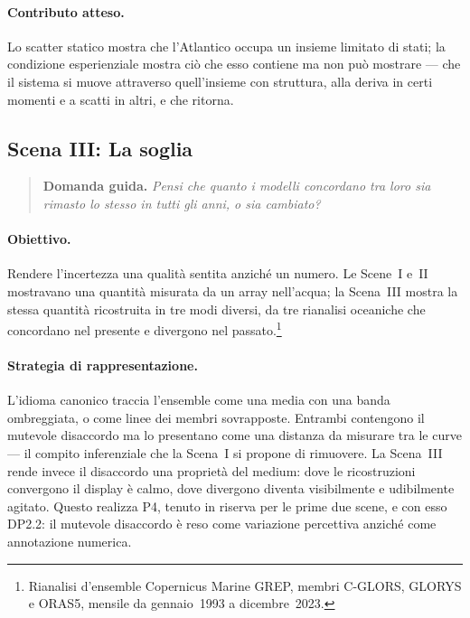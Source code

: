 \paragraph{Contributo atteso.} Lo scatter statico mostra che l'Atlantico occupa un insieme limitato di stati; la condizione esperienziale mostra ciò che esso contiene ma non può mostrare --- che il sistema si muove attraverso quell'insieme con struttura, alla deriva in certi momenti e a scatti in altri, e che ritorna.

\subsection{Scena III: La soglia}
\label{subsec:scene-threshold}

\begin{quote}
\textbf{Domanda guida.} \emph{Pensi che quanto i modelli concordano tra loro sia rimasto lo stesso in tutti gli anni, o sia cambiato?}
\end{quote}



\paragraph{Obiettivo.} Rendere l'incertezza una qualità sentita anziché un numero. Le Scene~I e~II mostravano una quantità misurata da un array nell'acqua; la Scena~III mostra la stessa quantità ricostruita in tre modi diversi, da tre rianalisi oceaniche che concordano nel presente e divergono nel passato.\footnote{Rianalisi d'ensemble Copernicus Marine GREP, membri C-GLORS, GLORYS e ORAS5, mensile da gennaio~1993 a dicembre~2023.}

\paragraph{Strategia di rappresentazione.} L'idioma canonico traccia l'ensemble come una media con una banda ombreggiata, o come linee dei membri sovrapposte. Entrambi contengono il mutevole disaccordo ma lo presentano come una distanza da misurare tra le curve --- il compito inferenziale che la Scena~I si propone di rimuovere. La Scena~III rende invece il disaccordo una proprietà del medium: dove le ricostruzioni convergono il display è calmo, dove divergono diventa visibilmente e udibilmente agitato. Questo realizza P4, tenuto in riserva per le prime due scene, e con esso DP2.2: il mutevole disaccordo è reso come variazione percettiva anziché come annotazione numerica.

